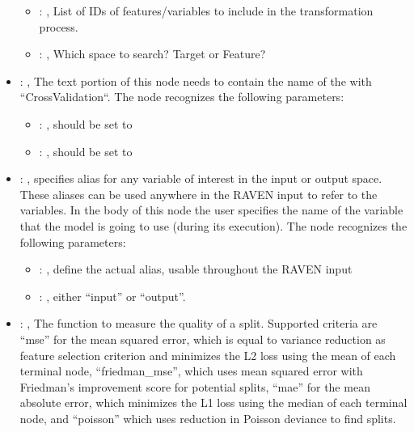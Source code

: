 \begin{itemize}
\begin{itemize}
        \item {}: , 
          List of IDs of features/variables to include in the transformation process.

        \item {}: , 
          Which space to search? Target or Feature?
      \end{itemize}

    \item {}: , 
      The text portion of this node needs to contain the name of the  with
               ``CrossValidation``.
      The  node recognizes the following parameters:
        \begin{itemize}
          \item {}: , 
            should be set to 
          \item {}: , 
            should be set to 
      \end{itemize}

    \item {}: , 
      specifies alias for         any variable of interest in the input or output space. These
      aliases can be used anywhere in the RAVEN input to         refer to the variables. In the body
      of this node the user specifies the name of the variable that the model is going to use
      (during its execution).
      The  node recognizes the following parameters:
        \begin{itemize}
          \item {}: , 
            define the actual alias, usable throughout the RAVEN input
          \item {}: , 
            either ``input'' or ``output''.
      \end{itemize}

    \item {}: , 
      The function to measure the quality of a split. Supported criteria are ``mse'' for the mean
      squared error,                                                  which is equal to variance
      reduction as feature selection criterion and minimizes the L2 loss using the mean of each
      terminal node, ``friedman\_mse'', which uses mean squared error with Friedman's improvement
      score for potential splits,                                                  ``mae'' for the
      mean absolute error, which minimizes the L1 loss using the median of each terminal node, and
      ``poisson''                                                  which uses reduction in Poisson
      deviance to find splits.


\end{itemize}
